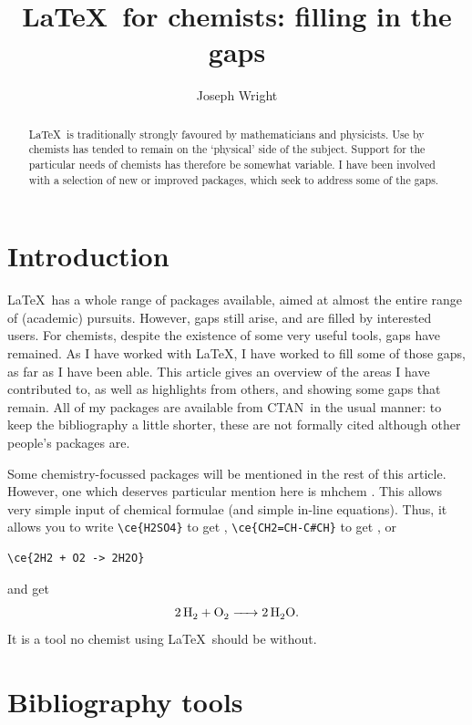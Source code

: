 \documentclass{article}
\title{\LaTeX\ for chemists: filling in the gaps}
\author{Joseph Wright}
\providecommand*\CTAN{\textsc{CTAN}}
\providecommand*\pkg[1]{\textsf{#1}}
\begin{document}
\maketitle

\begin{abstract}
\LaTeX\ is traditionally strongly favoured by mathematicians
and physicists.  Use by chemists has tended to remain on the
`physical' side of the subject.  Support for the particular
needs of chemists has therefore be somewhat variable.  I have
been involved with a selection of new or improved packages,
which seek to address some of the gaps.
\end{abstract}

\section{Introduction}

\LaTeX\ has a whole range of packages available, aimed at
almost the entire range of (academic) pursuits.  However, gaps
still arise, and are filled by interested users.  For chemists,
despite the existence of some very useful tools, gaps have
remained.  As I have worked with \LaTeX, I have worked to fill
some of those gaps, as far as I have been able.  This article
gives an overview of the areas I have contributed to, as well
as highlights from others, and showing some gaps that remain.
All of my packages are available from \CTAN\ in the usual
manner: to keep the bibliography a little shorter, these are
not formally cited although other people's packages are.

Some chemistry-focussed packages will be mentioned in the rest
of this article.  However, one which deserves particular
mention here is \pkg{mhchem} \cite{Hensel2007}.  This allows
very simple input of chemical formulae (and simple in-line
equations). Thus, it allows you to write \verb|\ce{H2SO4}| to
get , \verb|\ce{CH2=CH-C#CH}| to get
, or
\begin{verbatim}
\ce{2H2 + O2 -> 2H2O}
\end{verbatim}
and get
\begin{equation}
  \ce{2H2 + O2 -> 2H2O}.
\end{equation} 
It is a tool no chemist using \LaTeX\ should be without.

\section{Bibliography tools}
\end{document}
